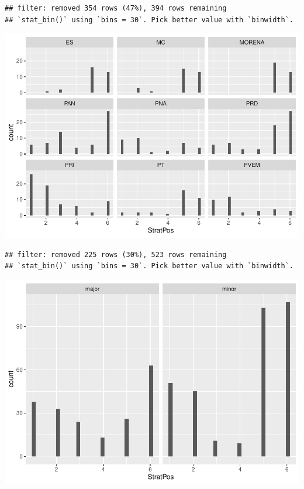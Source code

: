 \documentclass[]{article}
\newenvironment{Shaded}{\begin{snugshade}}{\end{snugshade}}
\newcommand{\KeywordTok}[1]{\textcolor[rgb]{0.13,0.29,0.53}{\textbf{#1}}}
\newcommand{\NormalTok}[1]{#1}
\newcommand{\OperatorTok}[1]{\textcolor[rgb]{0.81,0.36,0.00}{\textbf{#1}}}
\newcommand{\StringTok}[1]{\textcolor[rgb]{0.31,0.60,0.02}{#1}}
\begin{document}
\begin{verbatim}
## filter: removed 354 rows (47%), 394 rows remaining
## `stat_bin()` using `bins = 30`. Pick better value with `binwidth`.
\end{verbatim}

\includegraphics{ProposalAnalysis_files/figure-latex/unnamed-chunk-9-3.pdf}

\begin{Shaded}
\end{Shaded}

\begin{verbatim}
## filter: removed 225 rows (30%), 523 rows remaining
## `stat_bin()` using `bins = 30`. Pick better value with `binwidth`.
\end{verbatim}

\includegraphics{ProposalAnalysis_files/figure-latex/unnamed-chunk-9-4.pdf}
\end{document}
